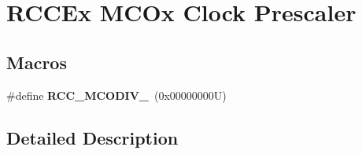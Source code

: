 \hypertarget{group___r_c_c_ex___m_c_ox___clock___prescaler}{}\section{R\+C\+C\+Ex M\+C\+Ox Clock Prescaler}
\label{group___r_c_c_ex___m_c_ox___clock___prescaler}
\subsection*{Macros}
\begin{DoxyCompactItemize}
\item 
\mbox{\label{group___r_c_c_ex___m_c_ox___clock___prescaler_ga438d8c3bead4e1ec5dd5757cb0313d53}} 
\#define {\bfseries R\+C\+C\+\_\+\+M\+C\+O\+D\+I\+V\+\_}~(0x00000000\+U)
\end{DoxyCompactItemize}


\subsection{Detailed Description}
